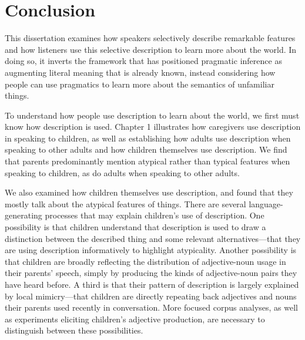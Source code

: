 \documentclass{ucetd}
\begin{document}
\hypertarget{conclusion-1}{%
\chapter*{Conclusion}\label{conclusion-1}}

This dissertation examines how speakers selectively describe remarkable
features and how listeners use this selective description to learn more
about the world. In doing so, it inverts the framework that has
positioned pragmatic inference as augmenting literal meaning that is
already known, instead considering how people can use pragmatics to
learn more about the semantics of unfamiliar things.

To understand how people use description to learn about the world, we
first must know how description is used. Chapter 1 illustrates how
caregivers use description in speaking to children, as well as
establishing how adults use description when speaking to other adults
and how children themselves use description. We find that parents
predominantly mention atypical rather than typical features when
speaking to children, as do adults when speaking to other adults.

We also examined how children themselves use description, and found that
they mostly talk about the atypical features of things. There are
several language-generating processes that may explain children's use of
description. One possibility is that children understand that
description is used to draw a distinction between the described thing
and some relevant alternatives---that they are using description
informatively to highlight atypicality. Another possibility is that
children are broadly reflecting the distribution of adjective-noun usage
in their parents' speech, simply by producing the kinds of
adjective-noun pairs they have heard before. A third is that their
pattern of description is largely explained by local mimicry---that
children are directly repeating back adjectives and nouns their parents
used recently in conversation. More focused corpus analyses, as well as
experiments eliciting children's adjective production, are necessary to
distinguish between these possibilities.
\end{document}
